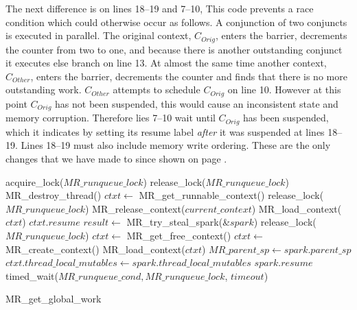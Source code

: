The next difference is on lines 18--19 and 7--10,
This code prevents a race condition which could otherwise occur as follows.
A conjunction of two conjuncts is executed in parallel.
The original context, $C_{Orig}$,
enters the barrier, decrements the counter from two to one,
and because there is another outstanding conjunct it executes else
branch on line 13.
At almost the same time another context, $C_{Other}$,
enters the barrier, decrements the counter and finds that there is no more
outstanding work.
$C_{Other}$ attempts to schedule $C_{Orig}$ on line 10.
However at this point $C_{Orig}$ has not been suspended, this would cause an
inconsistent state and memory corruption.
Therefore lies 7--10 wait until $C_{Orig}$ has been suspended, which it
indicates by setting its resume label \emph{after} it was suspended at lines
18--19.
Lines 18--19 must also include memory write ordering.
These are the only changes that we have made to \joinandcontinue since shown
on page \pageref{alg:join_and_continue_peterw}.

\begin{algorithm}
\begin{algorithmic}[1]
  \State acquire\_lock($MR\_runqueue\_lock$)
  \Loop
      \State release\_lock($MR\_runqueue\_lock$)
      \State MR\_destroy\_thread()
    \EndIf
    \State $ctxt \gets$ MR\_get\_runnable\_context()
      \State release\_lock($MR\_runqueue\_lock$)
        \State MR\_release\_context($current\_context$)
      \EndIf
      \State MR\_load\_context($ctxt$)
      \Goto $ctxt.resume$
    \EndIf
      \State $result \gets$ MR\_try\_steal\_spark(\&$spark$)
        \State release\_lock($MR\_runqueue\_lock$)
          \State $ctxt \gets$ MR\_get\_free\_context()
            \State $ctxt \gets$ MR\_create\_context()
          \EndIf
          \State MR\_load\_context($ctxt$)
        \EndIf
        \State $MR\_parent\_sp \gets spark.parent\_sp$
        \State $ctxt.thread\_local\_mutables \gets
          spark.thread\_local\_mutables$
        \Goto $spark.resume$
      \EndIf
    \EndIf
    \State timed\_wait($MR\_runqueue\_cond, MR\_runqueue\_lock$, $timeout$)
  \EndLoop
\EndProcedure
\end{algorithmic}
\caption{MR\_get\_global\_work}
\label{alg:MR_get_global_work_wsinitial}
\end{algorithm}

